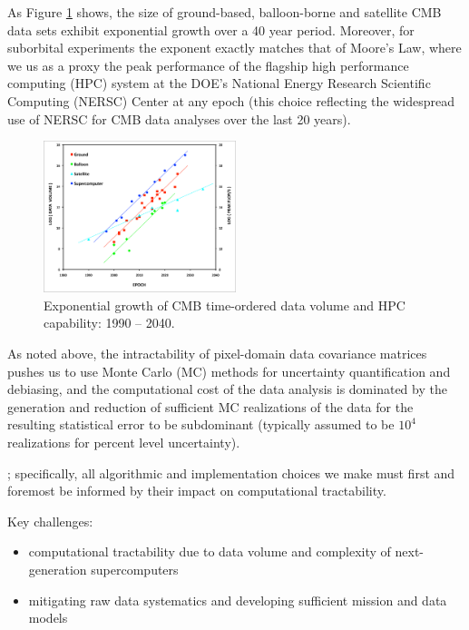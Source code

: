 As Figure \ref{fig_cmb_hpc_scaling} shows, the size of ground-based, balloon-borne and satellite CMB data sets exhibit exponential growth over a 40 year period. Moreover, for suborbital experiments the exponent exactly matches that of Moore's Law, where we us as a proxy the peak performance of the flagship high performance computing (HPC) system at the DOE's National Energy Research Scientific Computing (NERSC) Center at any epoch (this choice reflecting the widespread use of NERSC for CMB data analyses over the last 20 years). 



\begin{figure}[htbp]
\centering
\includegraphics[width=0.5\textwidth]{Analysis/cmb_hpc_scaling}
\caption{Exponential growth of CMB time-ordered data volume and HPC capability: 1990 -- 2040.}
\label{fig_cmb_hpc_scaling}
\end{figure}


As noted above, the intractability of pixel-domain data covariance matrices pushes us to use Monte Carlo (MC) methods for uncertainty quantification and debiasing, and the computational cost of the data analysis is dominated by the generation and reduction of sufficient MC realizations of the data for the resulting statistical error to be subdominant (typically assumed to be $10^4$ realizations for percent level uncertainty). 


; specifically, all algorithmic and implementation choices we make must first and foremost be informed by their impact on computational tractability.


Key challenges:
\begin{itemize}
\item computational tractability due to data volume and complexity of next-generation supercomputers
\item mitigating raw data systematics and developing sufficient mission and data models
\end{itemize}



